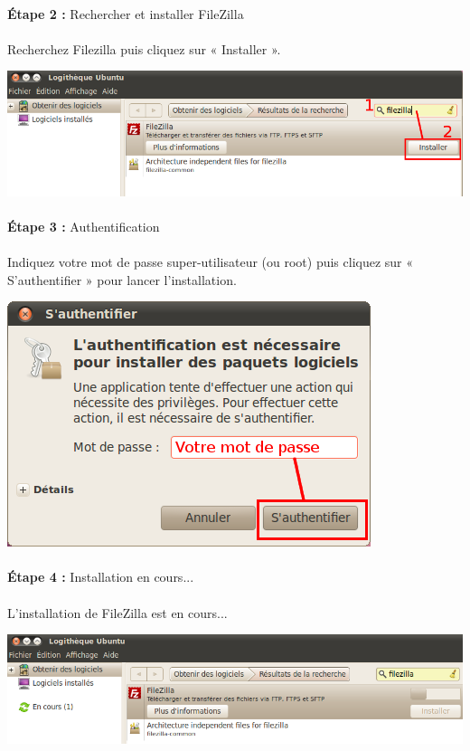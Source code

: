 \documentclass[10pt,a4paper]{article}
\begin{document}
\paragraph{}\textbf{Étape 2 : }Rechercher et installer FileZilla
\paragraph{}Recherchez Filezilla puis cliquez sur « Installer ».
\begin{center}
\includegraphics[scale=0.4]{img/0024.png}
\end{center}
\paragraph{}\textbf{Étape 3 : }Authentification
\paragraph{}Indiquez votre mot de passe super-utilisateur (ou root) puis cliquez sur « S'authentifier » pour lancer l'installation.
\begin{center}
\includegraphics[scale=0.4]{img/0025.png}
\end{center}
\paragraph{}\textbf{Étape 4 : }Installation en cours...
\paragraph{}L'installation de FileZilla est en cours...
\begin{center}
\includegraphics[scale=0.4]{img/0026.png}
\end{center}
\end{document}
